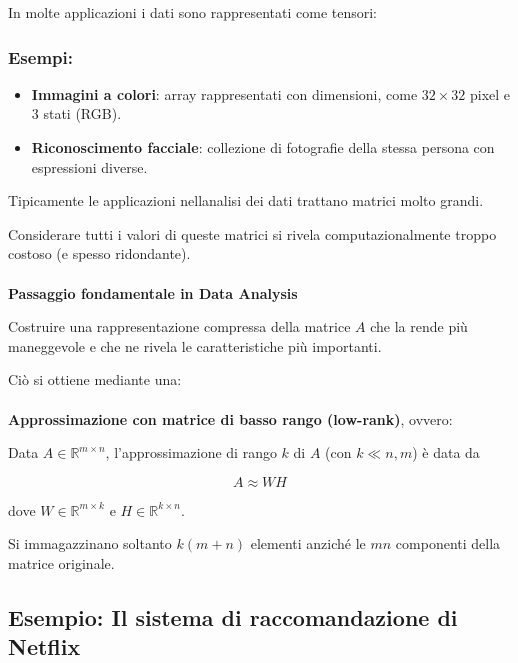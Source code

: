 \documentclass[a4paper, 11pt]{article}
\begin{document}
            In molte applicazioni i dati sono rappresentati come tensori:

            \subsubsection*{Esempi: }
            \begin{itemize}
                \item \textbf{Immagini a colori}: array rappresentati con dimensioni, come $32 \times 32$ pixel e 3 stati (RGB).
                \item \textbf{Riconoscimento facciale}: collezione di fotografie della stessa persona con espressioni diverse.
            \end{itemize}

            Tipicamente le applicazioni nellanalisi dei dati trattano matrici molto grandi.

            Considerare tutti i valori di queste matrici si rivela computazionalmente troppo costoso (e spesso ridondante).

            \paragraph{}
            \textbf{Passaggio fondamentale in Data Analysis}

            Costruire una rappresentazione compressa della matrice \( A \) che la rende più maneggevole e che ne rivela le caratteristiche più importanti.

            Ciò si ottiene mediante una:
            
            \paragraph{}
            \textbf{Approssimazione con matrice di basso rango (low-rank)}, ovvero:

            Data \( A \in \mathbb{R}^{m \times n} \), l'approssimazione di rango \( k \) di \( A \) (con \( k \ll n, m \)) è data da


            \[
            A \approx WH
            \]


            dove \( W \in \mathbb{R}^{m \times k} \) e \( H \in \mathbb{R}^{k \times n} \).

            Si immagazzinano soltanto \( k(m+n) \) elementi anziché le \( mn \) componenti della matrice originale.


        \subsection*{Esempio: Il sistema di raccomandazione di Netflix}
\end{document}
